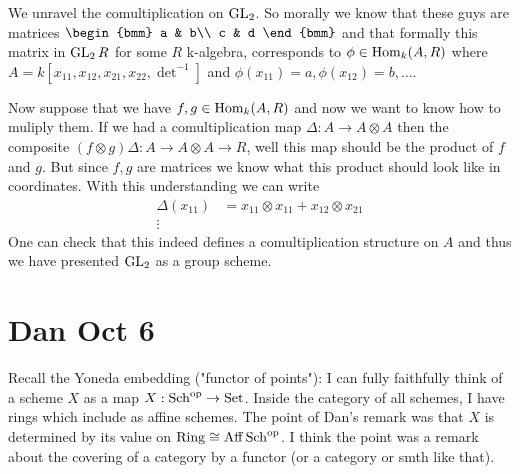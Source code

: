 \documentclass[12pt]{article}
\begin{document}
\begin{example}
We unravel the comultiplication on $\operatorname{GL}_2$. So morally we know that these guys are matrices $\begin{bmm}
    a & b\\
    c & d
\end{bmm}$ and that formally this matrix in $\operatorname{GL}_2R$ for some $R$ k-algebra, corresponds to $\phi\in\operatorname{Hom}_{k}(A,R)$ where $A = k[x_{11},x_{12},x_{21},x_{22},\det^{-1}]$ and $\phi(x_{11}) = a,\phi(x_{12}) = b,\dots$. 

\hfill 

Now suppose that we have $f,g\in\operatorname{Hom}_k(A,R)$ and now we want to know how to muliply them. If we had a comultiplication map $\Delta:A\to A\otimes A$ then the composite $(f\otimes g)\Delta:A\to A\otimes A\to R$, well this map should be the product of $f$ and $g$. But since $f,g$ are matrices we know what this product should look like in coordinates. With this understanding we can write \begin{align*}
    \Delta(x_{11}) &= x_{11}\otimes x_{11} + x_{12}\otimes x_{21} \\
    \vdots
\end{align*} One can check that this indeed defines a comultiplication structure on $A$ and thus we have presented $\operatorname{GL}_2$ as a group scheme.
\end{example}

\section{Dan Oct 6}


Recall the Yoneda embedding ("functor of points"): I can fully faithfully think of a scheme $X$ as a map $X:\operatorname{Sch}^{\operatorname{op}} \to\operatorname{Set}$. Inside the category of all schemes, I have rings which include as affine schemes. The point of Dan's remark was that $X$ is determined by its value on $\operatorname{Ring} \cong \operatorname{Aff} \operatorname{Sch}^{\operatorname{op}}$. I think the point was a remark about the covering of a category by a functor (or a category or smth like that).

\hfill
\end{document}
